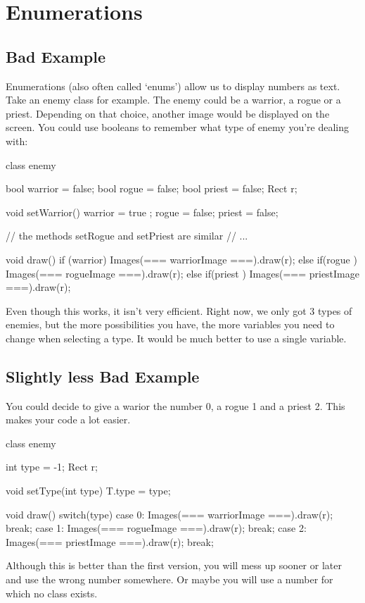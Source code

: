 \chapter{Enumerations}
\section{Bad Example}

Enumerations (also often called `enums') allow us to display numbers as text. Take an enemy class for example. The enemy could be a warrior, a rogue or a priest. Depending on that choice, another image would be displayed on the screen. You could use booleans to remember what type of enemy you're dealing with:

\begin{code}
class enemy {
  bool warrior = false;
  bool rogue   = false;
  bool priest  = false;
  Rect r;

  void setWarrior() {
    warrior = true ;
    rogue   = false;
    priest  = false;
  }

  // the methods setRogue and setPriest are similar
  // ...

  void draw() {
    if     (warrior) Images(=== warriorImage ===).draw(r);
    else if(rogue  ) Images(=== rogueImage   ===).draw(r);
    else if(priest ) Images(=== priestImage  ===).draw(r);
  }
}
\end{code}

Even though this works, it isn't very efficient. Right now, we only got 3 types of enemies, but the more possibilities you have, the more variables you need to change when selecting a type. It would be much better to use a single variable.

\section{Slightly less Bad Example}
You could decide to give a warior the number 0, a rogue 1 and a priest 2. This makes your code a lot easier.

\begin{code}
class enemy {
  int type = -1;
	Rect r;
	
	void setType(int type) {
		T.type = type;
	}
	
	void draw() {
		switch(type) {
			case 0: Images(=== warriorImage ===).draw(r); break;
			case 1: Images(=== rogueImage   ===).draw(r); break;
			case 2: Images(=== priestImage  ===).draw(r); break;
	  }
	}
}
\end{code}
Although this is better than the first version, you will mess up sooner or later and use the wrong number somewhere. Or maybe you will use a number for which no class exists.

